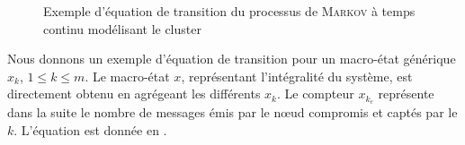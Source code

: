 \newlength{\fboxlinelen}
\setlength{\fboxlinelen}{\linewidth}
\addtolength{\fboxlinelen}{-4\fboxsep}
\addtolength{\fboxlinelen}{-2\fboxrule}
\begin{figure}[ht]
    \caption{Exemple d'équation de transition du processus de \textsc{Markov} à temps continu modélisant le cluster}\label{sa:fig:eqtrans}
\end{figure}

Nous donnons un exemple d'équation de transition pour un macro-état générique $x_k$, $1\leq k\leq m$.
Le macro-état $x$, représentant l'intégralité du système, est directement obtenu en agrégeant les différents $x_k$.
Le compteur $x_{k_c}$ représente dans la suite le nombre de messages émis par le nœud compromis et captés par le \cn $k$.
L'équation est donnée en .


